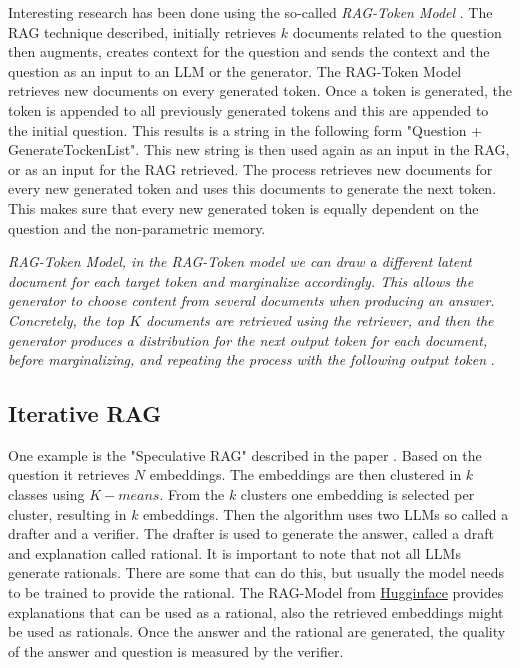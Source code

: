 \documentclass{wseas}
\begin{document}
Interesting research has been done using the so-called \emph{RAG-Token
Model} \cite{Retrieval_Augmented_Generation_(RAG)_Explained_Understanding_Key_Concepts}. The RAG technique described, initially retrieves \(k\) documents
related to the question then augments, creates context for the question and
sends the context and the question as an input to an LLM or the
generator. The RAG-Token Model retrieves new documents on every
generated token. Once a token is generated, the token is appended to all
previously generated tokens and this are appended to the initial
question. This results is a string in the following form "Question +
GenerateTockenList". This new string is then used again as an input in
the RAG, or as an input for the RAG retrieved. The process retrieves new
documents for every new generated token and uses this documents to
generate the next token. This makes sure that every new generated token
is equally dependent on the question and the non-parametric memory.

\emph{RAG-Token Model, in the RAG-Token model we can draw a different
latent document for each target token and marginalize accordingly. This
allows the generator to choose content from several documents when
producing an answer. Concretely, the top $K$ documents are retrieved using
the retriever, and then the generator produces a distribution for the
next output token for each document, before marginalizing, and repeating
the process with the following output token}
\cite{Retrieval_Augmented_Generation_(RAG)_Explained_Understanding_Key_Concepts}.

\subsection{Iterative RAG}

One example is the "Speculative RAG" described in the paper \cite{SpeculativeRAG_EnhancingRetrieval-AugmentedGenerationThroughDrafting}. 
Based on the question it retrieves \(N\) embeddings. The
embeddings are then clustered in \(k\) classes using $K-means$. From the
\(k\) clusters one embedding is selected per cluster, resulting in $k$
embeddings. Then the algorithm uses two LLMs so called a drafter and a
verifier. The drafter is used to generate the answer, called a draft and
explanation called rational. It is important to note that not all LLMs
generate rationals. There are some that can do this, but usually the
model needs to be trained to provide the rational. The RAG-Model from
\href{https://huggingface.co/}{Hugginface} provides explanations that 
can be used as a rational, also the retrieved embeddings might be used 
as rationals. Once the answer and the rational are generated, the quality 
of the answer and question is measured by the verifier.
\end{document}
